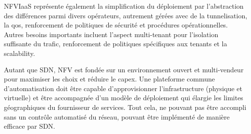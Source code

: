 NFVIaaS représente également la simplification du déploiement par l'abstraction des différences parmi divers opérateurs, autrement gérées avec de la tunnelisation, la \gls{qos}, renforcement de politiques de sécurité et procédures opérationnelles. Autres besoins importants incluent l'aspect multi-tenant pour l'isolation suffisante du trafic, renforcement de politiques spécifiques aux tenants et la \gls{scalability}.

Autant que SDN, NFV est fondée sur un environnement ouvert et multi-vendeur pour maximiser les choix et réduire le \gls{capex}. Une plateforme commune d'automatisation doit être capable d'approvisionner l'infrastructure (physique et virtuelle) et être accompagnée d'un modèle de déploiement qui élargie les limites géographiques du fournisseur de services. Tout cela, ne pouvant pas être accompli sans un contrôle automatisé du réseau, pouvant être implémenté de manière efficace par SDN. \cite{OFSDNNFVand} \cite{nfvUseCases}
